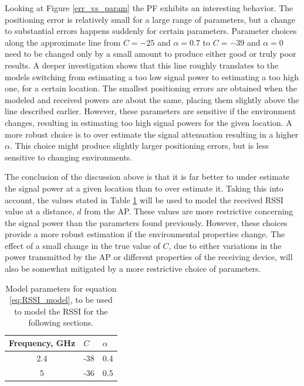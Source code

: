 \documentclass{LTHthesis}
\begin{document}
Looking at Figure \ref{err_vs_param} the PF exhibits an interesting behavior. The positioning error is relatively small for a large range of parameters, but a change to substantial errors happens suddenly for certain parameters. Parameter choices along the approximate line from $C=-25$ and $\alpha=0.7$ to $C=-39$ and $\alpha=0$ need to be changed only by a small amount to produce either good or truly poor results. A deeper investigation shows that this line roughly translates to the models switching from estimating a too low signal power to estimating a too high one, for a certain location. The smallest positioning errors are obtained when the modeled and received powers are about the same, placing them slightly above the line described earlier. However, these parameters are sensitive if the environment changes, resulting in estimating too high signal powers for the given location. A more robust choice is to over estimate the signal attenuation resulting in a higher $\alpha$. This choice might produce slightly larger positioning errors, but is less sensitive to changing environments.

The conclusion of the discussion above is that it is far better to under estimate the signal power at a given location than to over estimate it. Taking this into account, the values stated in Table \ref{table:model_par} will be used to model the received RSSI value at a distance, $d$ from the AP.  These values are more restrictive concerning the signal power than the parameters found previously. However, these choices provide a more robust estimation if the environmental properties change. The effect  of a small change in the true value of $C$, due to either variations in the power transmitted by the AP or different properties of the receiving device, will also be somewhat mitigated by a more restrictive choice of parameters.  
%
\begin{table}[!hbt]
\begin{center}
\begin{tabular}{|c|l|l|}
\hline
Frequency, GHz & $C$ & $\alpha$ \\
\hline
2.4 & -38 & 0.4 \\
\hline
5 & -36 & 0.5 \\
\hline
\end{tabular}
\end{center}
\caption{Model parameters for equation \ref{eq:RSSI_model}, to be used to model the RSSI for the following sections.}\label{table:model_par}
\end{table}
  
\end{document}
